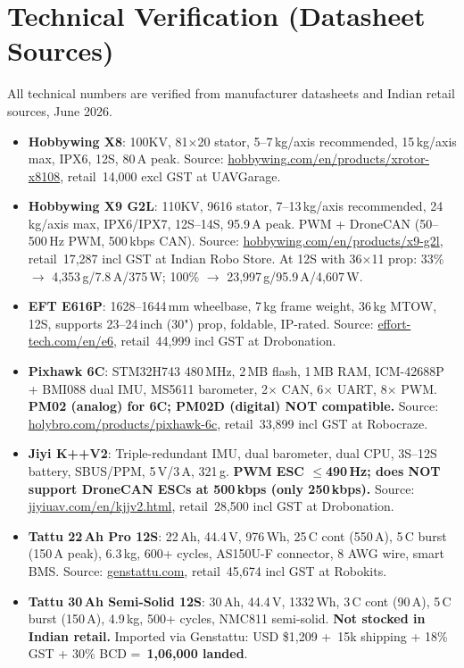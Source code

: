 \documentclass[11pt,a4paper]{article}
\newcommand{\Rs}{\rupee\,}
\begin{document}
\section{Technical Verification (Datasheet Sources)}

All technical numbers are verified from manufacturer datasheets and Indian retail sources, June 2026.

\begin{itemize}
  \item \textbf{Hobbywing X8}: 100KV, 81$\times$20 stator, 5--7\,kg/axis recommended, 15\,kg/axis max, IPX6, 12S, 80\,A peak. Source: \url{hobbywing.com/en/products/xrotor-x8108}, retail \Rs{}14,000 excl GST at UAVGarage.
  \item \textbf{Hobbywing X9 G2L}: 110KV, 9616 stator, 7--13\,kg/axis recommended, 24\,kg/axis max, IPX6/IPX7, 12S--14S, 95.9\,A peak. PWM + DroneCAN (50--500\,Hz PWM, 500\,kbps CAN). Source: \url{hobbywing.com/en/products/x9-g2l}, retail \Rs{}17,287 incl GST at Indian Robo Store. At 12S with 36$\times$11 prop: 33\% $\rightarrow$ 4,353\,g/7.8\,A/375\,W; 100\% $\rightarrow$ 23,997\,g/95.9\,A/4,607\,W.
  \item \textbf{EFT E616P}: 1628--1644\,mm wheelbase, 7\,kg frame weight, 36\,kg MTOW, 12S, supports 23--24\,inch (30") prop, foldable, IP-rated. Source: \url{effort-tech.com/en/e6}, retail \Rs{}44,999 incl GST at Drobonation.
  \item \textbf{Pixhawk 6C}: STM32H743 480\,MHz, 2\,MB flash, 1\,MB RAM, ICM-42688P + BMI088 dual IMU, MS5611 barometer, 2$\times$ CAN, 6$\times$ UART, 8$\times$ PWM. \textbf{PM02 (analog) for 6C; PM02D (digital) NOT compatible.} Source: \url{holybro.com/products/pixhawk-6c}, retail \Rs{}33,899 incl GST at Robocraze.
  \item \textbf{Jiyi K++V2}: Triple-redundant IMU, dual barometer, dual CPU, 3S--12S battery, SBUS/PPM, 5\,V/3\,A, 321\,g. \textbf{PWM ESC $\le$490\,Hz; does NOT support DroneCAN ESCs at 500\,kbps (only 250\,kbps).} Source: \url{jiyiuav.com/en/kjjv2.html}, retail \Rs{}28,500 incl GST at Drobonation.
  \item \textbf{Tattu 22\,Ah Pro 12S}: 22\,Ah, 44.4\,V, 976\,Wh, 25\,C cont (550\,A), 5\,C burst (150\,A peak), 6.3\,kg, 600+ cycles, AS150U-F connector, 8 AWG wire, smart BMS. Source: \url{genstattu.com}, retail \Rs{}45,674 incl GST at Robokits.
  \item \textbf{Tattu 30\,Ah Semi-Solid 12S}: 30\,Ah, 44.4\,V, 1332\,Wh, 3\,C cont (90\,A), 5\,C burst (150\,A), 4.9\,kg, 500+ cycles, NMC811 semi-solid. \textbf{Not stocked in Indian retail.} Imported via Genstattu: USD \$1,209 + \Rs{}15k shipping + 18\% GST + 30\% BCD = \textbf{\Rs{}1,06,000 landed}.

\end{itemize}
\end{document}

